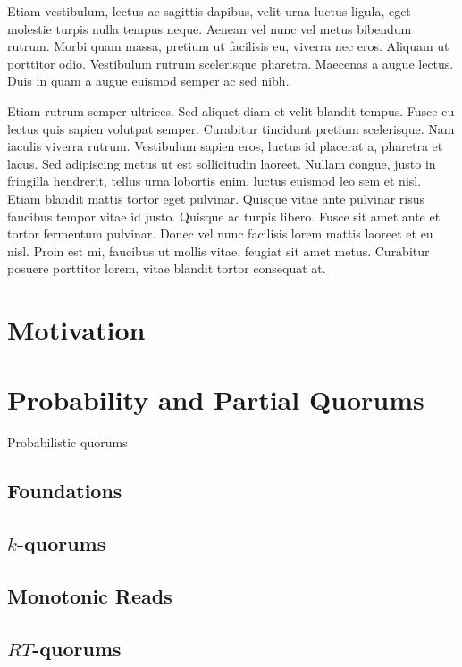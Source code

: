 \documentclass{vldb}
\begin{document}
Etiam vestibulum, lectus ac sagittis dapibus, velit urna luctus ligula, eget molestie turpis nulla tempus neque. Aenean vel nunc vel metus bibendum rutrum. Morbi quam massa, pretium ut facilisis eu, viverra nec eros. Aliquam ut porttitor odio. Vestibulum rutrum scelerisque pharetra. Maecenas a augue lectus. Duis in quam a augue euismod semper ac sed nibh.

Etiam rutrum semper ultrices. Sed aliquet diam et velit blandit tempus. Fusce eu lectus quis sapien volutpat semper. Curabitur tincidunt pretium scelerisque. Nam iaculis viverra rutrum. Vestibulum sapien eros, luctus id placerat a, pharetra et lacus. Sed adipiscing metus ut est sollicitudin laoreet. Nullam congue, justo in fringilla hendrerit, tellus urna lobortis enim, luctus euismod leo sem et nisl. Etiam blandit mattis tortor eget pulvinar. Quisque vitae ante pulvinar risus faucibus tempor vitae id justo. Quisque ac turpis libero. Fusce sit amet ante et tortor fermentum pulvinar. Donec vel nunc facilisis lorem mattis laoreet et eu nisl. Proin est mi, faucibus ut mollis vitae, feugiat sit amet metus. Curabitur posuere porttitor lorem, vitae blandit tortor consequat at.

\section{Motivation}

\section{Probability and Partial Quorums}

Probabilistic quorums~\cite{prob-quorum}

\subsection{Foundations}

\subsection{$k$-quorums}

\subsection{Monotonic Reads}

\subsection{$RT$-quorums}
\end{document}
